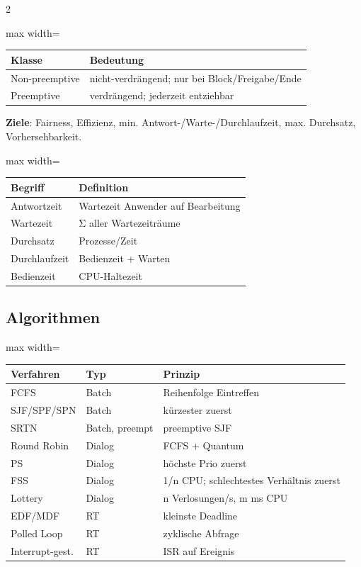\documentclass[10pt, a4paper]{article}
\begin{document}
\begin{multicols}{2}
{\small
\begin{adjustbox}{max width=\linewidth}
{\scriptsize
\begin{tabular}{ll}
\toprule
\textbf{Klasse} & \textbf{Bedeutung} \\
\midrule
Non-preemptive & nicht-verdrängend; nur bei Block/Freigabe/Ende \\
Preemptive & verdrängend; jederzeit entziehbar \\
\bottomrule
\end{tabular}
}
\end{adjustbox}
}


\textbf{Ziele}: Fairness, Effizienz, min. Antwort-/Warte-/Durchlaufzeit, max. Durchsatz, Vorhersehbarkeit.



{\small
\begin{adjustbox}{max width=\linewidth}
{\scriptsize
\begin{tabular}{ll}
\toprule
\textbf{Begriff} & \textbf{Definition} \\
\midrule
Antwortzeit & Wartezeit Anwender auf Bearbeitung \\
Wartezeit & Σ aller Wartezeiträume \\
Durchsatz & Prozesse/Zeit \\
Durchlaufzeit & Bedienzeit + Warten \\
Bedienzeit & CPU-Haltezeit \\
\bottomrule
\end{tabular}
}
\end{adjustbox}
}



\subsection{Algorithmen}


{\small
\begin{adjustbox}{max width=\linewidth}
{\scriptsize
\begin{tabular}{lll}
\toprule
\textbf{Verfahren} & \textbf{Typ} & \textbf{Prinzip} \\
\midrule
FCFS & Batch & Reihenfolge Eintreffen \\
SJF/SPF/SPN & Batch & kürzester zuerst \\
SRTN & Batch, preempt & preemptive SJF \\
Round Robin & Dialog & FCFS + Quantum \\
PS & Dialog & höchste Prio zuerst \\
FSS & Dialog & 1/n CPU; schlechtestes Verhältnis zuerst \\
Lottery & Dialog & n Verlosungen/s, m ms CPU \\
EDF/MDF & RT & kleinste Deadline \\
Polled Loop & RT & zyklische Abfrage \\
Interrupt-gest. & RT & ISR auf Ereignis \\
\bottomrule
\end{tabular}
}
\end{adjustbox}
}



\end{multicols}
\end{document}
